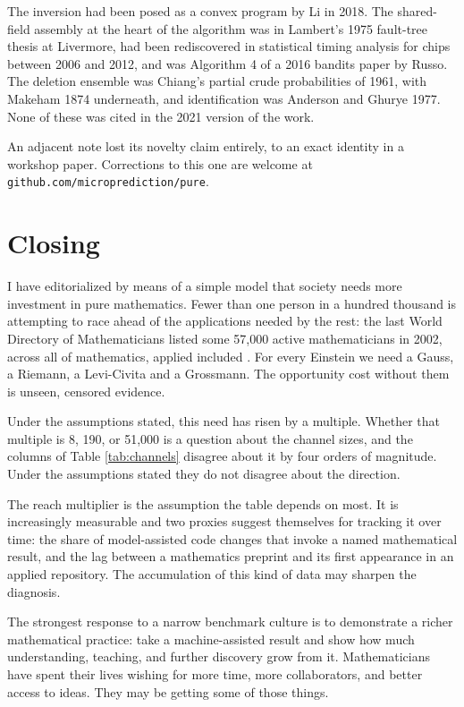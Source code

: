 \documentclass[11pt]{article}
\theoremstyle{definition}
\theoremstyle{remark}
\begin{document}
The inversion had been posed as a convex program by Li in 2018. The shared-field assembly at the heart of the algorithm was in Lambert's 1975 fault-tree thesis at Livermore, had been rediscovered in statistical timing analysis for chips between 2006 and 2012, and was Algorithm 4 of a 2016 bandits paper by Russo. The deletion ensemble was Chiang's partial crude probabilities of 1961, with Makeham 1874 underneath, and identification was Anderson and Ghurye 1977. None of these was cited in the 2021 version of the work.

An adjacent note lost its novelty claim entirely, to an exact identity in a workshop paper. Corrections to this one are welcome at \texttt{github.com/microprediction/pure}.

\section{Closing}

I have editorialized by means of a simple model that society needs more investment in pure mathematics. Fewer than one person in a hundred thousand is attempting to race ahead of the applications needed by the rest: the last World Directory of Mathematicians listed some 57{,}000 active mathematicians in 2002, across all of mathematics, applied included \citep{imu2002}. For every Einstein we need a Gauss, a Riemann, a Levi-Civita and a Grossmann. The opportunity cost without them is unseen, censored evidence.

Under the assumptions stated, this need has risen by a multiple. Whether that multiple is 8, 190, or 51{,}000 is a question about the channel sizes, and the columns of Table \ref{tab:channels} disagree about it by four orders of magnitude. Under the assumptions stated they do not disagree about the direction.

The reach multiplier is the assumption the table depends on most. It is increasingly measurable and two proxies suggest themselves for tracking it over time: the share of model-assisted code changes that invoke a named mathematical result, and the lag between a mathematics preprint and its first appearance in an applied repository. The accumulation of this kind of data may sharpen the diagnosis.

The strongest response to a narrow benchmark culture is to demonstrate a richer mathematical practice: take a machine-assisted result and show how much understanding, teaching, and further discovery grow from it. Mathematicians have spent their lives wishing for more time, more collaborators, and better access to ideas. They may be getting some of those things.
\end{document}
